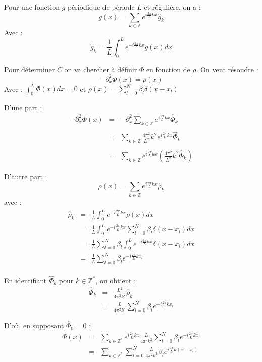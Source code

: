\documentclass[a4paper,11pt]{article}
\begin{document}
Pour une fonction $g$ périodique de période $L$ et régulière, on a :
$$
g(x) = \sum\limits_{k \in \mathbb{Z}} e^{i\frac{2 \pi}{L} kx} \widehat{g}_k
$$
Avec :
$$
\widehat{g}_k = \frac{1}{L} \int_0 ^L e^{-i\frac{2 \pi}{L} kx} g(x) dx
$$

Pour déterminer $C$ on va chercher à définir $\Phi$ en fonction de $\rho$.
On veut résoudre :
$$
- \partial ^2 _x \Phi(x) = \rho (x)
$$
Avec : $\int _0 ^L \Phi(x) dx = 0$ et $\rho (x) = \sum\limits_{l=0} ^N \beta_l \delta(x - x_l)$

D'une part :
$$
\begin{array}{rcl}
- \partial ^2 _x \Phi(x) &=& - \partial ^2 _x \sum\limits_{k \in \mathbb{Z}} e^{i\frac{2 \pi}{L} kx} \widehat{\Phi}_k \\ \\
 &=& \sum\limits_{k \in \mathbb{Z}} \frac{4 \pi^2}{L^2}k^2 e^{i\frac{2 \pi}{L} kx} \widehat{\Phi}_k \\ \\
 &=& \sum\limits_{k \in \mathbb{Z}} e^{i\frac{2 \pi}{L} kx} (\frac{4 \pi^2}{L^2}k^2  \widehat{\Phi}_k) 
\end{array}
$$

D'autre part :
$$
\rho(x) = \sum\limits_{k \in \mathbb{Z}} e^{i\frac{2 \pi}{L} kx} \widehat{\rho}_k
$$
avec :
$$
\begin{array}{rcl}
\widehat{\rho}_k &=& \frac{1}{L} \int_0 ^L e^{-i\frac{2 \pi}{L} kx} \rho(x) dx \\
 &=& \frac{1}{L} \int_0 ^L e^{-i\frac{2 \pi}{L} kx} \sum\limits_{l=0} ^N \beta_l \delta(x - x_l) dx \\
 &=& \frac{1}{L} \sum\limits_{l=0} ^N \beta_l \int_0 ^L e^{-i\frac{2 \pi}{L} kx} \delta(x - x_l) dx \\
 &=& \frac{1}{L} \sum\limits_{l=0} ^N \beta_l e^{-i\frac{2 \pi}{L} kx_l} \\
\end{array}
$$

En identifiant $\widehat{\Phi}_k$ pour $k \in \mathbb{Z}^*$, on obtient :
$$
\begin{array}{rcl}
\widehat{\Phi}_k &=& \frac{L^2}{4 \pi^2 k^2} \widehat{\rho}_k \\
 &=& \frac{L}{4 \pi^2 k^2} \sum\limits_{l=0} ^N \beta_l e^{-i\frac{2 \pi}{L} kx_l}
\end{array}
$$

D'où, en supposant $\widehat{\Phi}_0 = 0$ : 
$$
\begin{array}{rcl}
\Phi(x) &=& \sum\limits_{k \in \mathbb{Z}^*} e^{i\frac{2 \pi}{L} kx} \frac{L}{4 \pi^2 k^2} \sum\limits_{l=0} ^N \beta_l e^{-i\frac{2 \pi}{L} kx_l} \\
 &=& \sum\limits_{k \in \mathbb{Z}^*} \sum\limits_{l=0} ^N \frac{L}{4 \pi^2 k^2} \beta_l e^{i\frac{2 \pi}{L} k( x -x_l)}
\end{array}
$$
\end{document}
